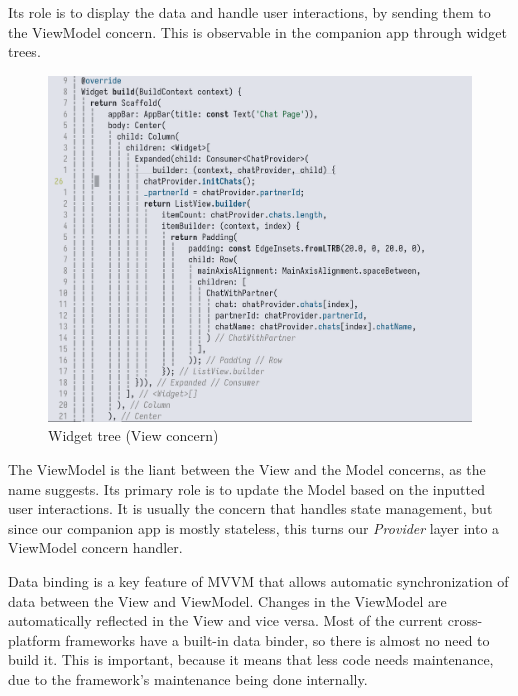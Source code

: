 Its role is to display the data and handle user interactions, by sending them to the ViewModel concern. 
This is observable in the companion app through widget trees.
\begin{figure}[htbp]
    \centering
    \includegraphics[scale=0.3]{pictures/widget_tree.png}
    \caption{Widget tree (View concern)}
    \label{widgetTreeExample}
\end{figure}
\par
The ViewModel is the liant between the View and the Model concerns, as the name suggests. 
Its primary role is to update the Model based on the inputted user interactions. 
It is usually the concern that handles state management, but since our companion app is mostly stateless, 
this turns our \textit{Provider} layer into a ViewModel concern handler.

\par
Data binding is a key feature of MVVM that allows automatic synchronization of data between the View and ViewModel. 
Changes in the ViewModel are automatically reflected in the View and vice versa. Most of the current cross-platform frameworks have a built-in data binder, 
so there is almost no need to build it. 
This is important, because it means that less code needs maintenance, due to the framework's maintenance being done internally.

